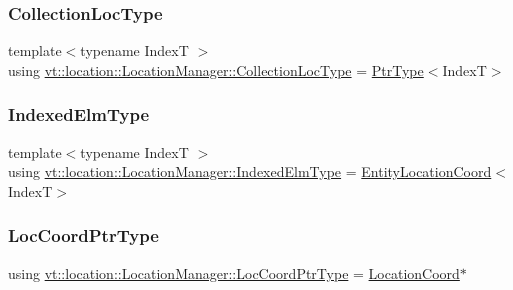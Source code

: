 \subsubsection{\texorpdfstring{Collection\+Loc\+Type}{CollectionLocType}}
{\footnotesize\ttfamily template$<$typename IndexT $>$ \\
using \hyperlink{structvt_1_1location_1_1_location_manager_a64dfcff13e5cebcdfb31998bef4b8d58}{vt\+::location\+::\+Location\+Manager\+::\+Collection\+Loc\+Type} =  \hyperlink{structvt_1_1location_1_1_location_manager_a32d8bca6ed6909a2190286408335d3b4}{Ptr\+Type}$<$IndexT$>$}

\mbox{\label{structvt_1_1location_1_1_location_manager_a9241475655a978ac717ffe5791ad7d15}} 
\subsubsection{\texorpdfstring{Indexed\+Elm\+Type}{IndexedElmType}}
{\footnotesize\ttfamily template$<$typename IndexT $>$ \\
using \hyperlink{structvt_1_1location_1_1_location_manager_a9241475655a978ac717ffe5791ad7d15}{vt\+::location\+::\+Location\+Manager\+::\+Indexed\+Elm\+Type} =  \hyperlink{structvt_1_1location_1_1_entity_location_coord}{Entity\+Location\+Coord}$<$IndexT$>$}

\mbox{\label{structvt_1_1location_1_1_location_manager_a98ed824c058080e538546fc731cb8f4c}} 
\subsubsection{\texorpdfstring{Loc\+Coord\+Ptr\+Type}{LocCoordPtrType}}
{\footnotesize\ttfamily using \hyperlink{structvt_1_1location_1_1_location_manager_a98ed824c058080e538546fc731cb8f4c}{vt\+::location\+::\+Location\+Manager\+::\+Loc\+Coord\+Ptr\+Type} =  \hyperlink{structvt_1_1location_1_1_location_coord}{Location\+Coord}$\ast$}

